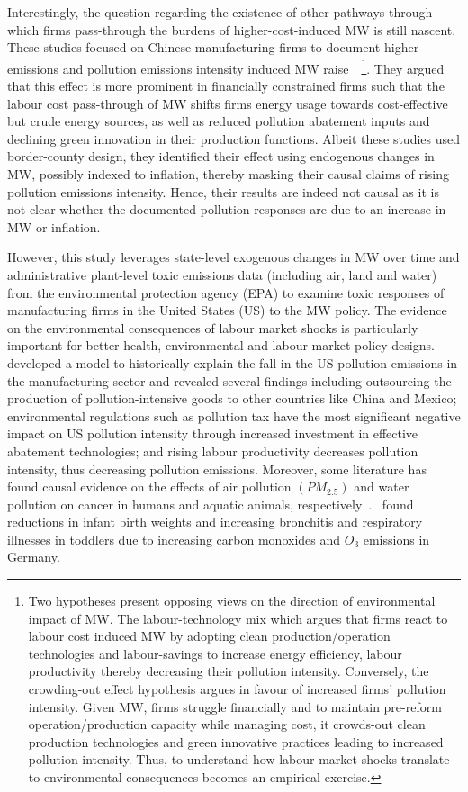 \documentclass[12pt, english]{article}
\begin{document}
    Interestingly, the question regarding the existence of other pathways through which firms pass-through the burdens of higher-cost-induced MW is still nascent. These studies focused on Chinese manufacturing firms to document higher emissions and pollution emissions intensity induced MW raise~\parencite{li2023does, zhang2023unintended}~\footnote{\tiny Two hypotheses present opposing views on the direction of environmental impact of MW. The labour-technology mix which argues that firms react to labour cost induced MW by adopting clean production/operation technologies and labour-savings to increase energy efficiency, labour productivity thereby decreasing their pollution intensity. Conversely, the crowding-out effect hypothesis argues in favour of increased firms' pollution intensity. Given MW, firms struggle financially and to maintain pre-reform operation/production capacity while managing cost, it crowds-out clean production technologies and green innovative practices leading to increased pollution intensity. Thus, to understand how labour-market shocks translate to environmental consequences becomes an empirical exercise.}. They argued that this effect is more prominent in financially constrained firms such that the labour cost pass-through of MW shifts firms energy usage towards cost-effective but crude energy sources, as well as reduced pollution abatement inputs and declining green innovation in their production functions. Albeit these studies used border-county design, they identified their effect using endogenous changes in MW, possibly indexed to inflation, thereby masking their causal claims of rising pollution emissions intensity. Hence, their results are indeed not causal as it is not clear whether the documented pollution responses are due to an increase in MW or inflation.

    However, this study leverages state-level exogenous changes in MW over time and administrative plant-level toxic emissions data (including air, land and water) from the environmental protection agency (EPA) to examine toxic responses of manufacturing firms in the United States (US) to the MW policy. The evidence on the environmental consequences of labour market shocks is particularly important for better health, environmental and labour market policy designs.~\cite{shapiro2018pollution} developed a model to historically explain the fall in the US pollution emissions in the manufacturing sector and revealed several findings including outsourcing the production of pollution-intensive goods to other countries like China and Mexico; environmental regulations such as pollution tax have the most significant negative impact on US pollution intensity through increased investment in effective abatement technologies; and rising labour productivity decreases pollution intensity, thus decreasing pollution emissions. Moreover, some literature has found causal evidence on the effects of air pollution $(PM_{2.5})$ and water pollution on cancer in humans and aquatic animals, respectively~\parencite{turner2020outdoor, turner2017ambient, baines2021linking}.~\cite{coneus2012pollution} found reductions in infant birth weights and increasing bronchitis and respiratory illnesses in toddlers due to increasing carbon monoxides and $O_{3}$ emissions in Germany.
\end{document}
